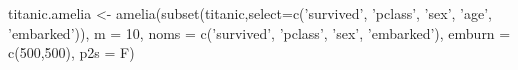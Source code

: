\begin{Schunk}
\begin{Sinput}
 titanic.amelia <- amelia(subset(titanic,select=c('survived', 'pclass', 'sex', 'age', 'embarked')), m = 10,  noms = c('survived', 'pclass', 'sex', 'embarked'), emburn = c(500,500), p2s = F)
\end{Sinput}
\end{Schunk}
